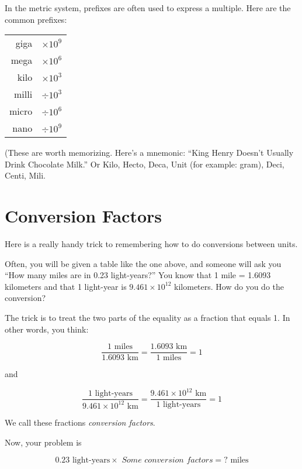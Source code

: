 In the metric system, prefixes are often used to express a multiple. Here are the common prefixes:

\begin{mdframed}[style=important, frametitle={Common Prefixes for Metric Units}]

\begin{tabular}{r | l}
giga  & $\times 10^{9}$\\
mega  & $\times 10^{6}$\\
kilo  & $\times 10^{3}$\\
milli  & $\div 10^{3}$\\
micro  & $\div 10^{6}$\\
nano  & $\div 10^{9}$\\
\end{tabular}

(These are worth memorizing. Here's a mnemonic: ``King Henry Doesn't Usually Drink Chocolate Milk.'' Or Kilo, Hecto, Deca, Unit (for example: gram), Deci, Centi, Mili.
\end{mdframed}

\section{Conversion Factors}

Here is a really handy trick to remembering how to do conversions
between units.

Often, you will be given a table like the one above, and someone will ask you
``How many miles are in 0.23 light-years?'' You know that 1 mile = 1.6093
kilometers and that 1 light-year is $9.461 \times 10^{12}$ kilometers.
How do you do the conversion?

The trick is to treat the two parts of the equality as a fraction that equals 1. In other words, you think:

$$\frac{1 \text{ miles}}{1.6093 \text{ km}} = \frac{1.6093 \text{ km}}{1 \text{ miles}} = 1$$

and

$$\frac{1 \text{ light-years}}{9.461 \times 10^{12} \text{ km}} = \frac{9.461 \times 10^{12} \text{ km}}{1 \text{ light-years}} = 1$$

We call these fractions \textit{conversion factors}.

Now, your problem is

$$0.23 \text{ light-years} \times \textit{ Some conversion factors} = ? \text{ miles}$$

